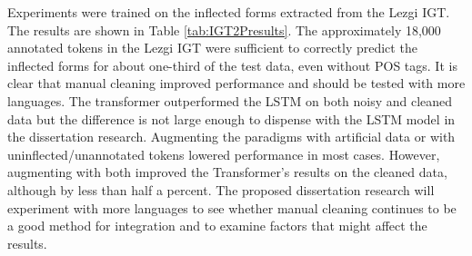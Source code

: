 Experiments were trained on the inflected forms extracted from the Lezgi IGT. The results are shown in Table \ref{tab:IGT2Presults}. The approximately 18,000 annotated tokens in the Lezgi IGT were sufficient to correctly predict the inflected forms for about one-third of the test data, even without POS tags. It is clear that manual cleaning improved performance and should be tested with more languages. The transformer outperformed the LSTM on both noisy and cleaned data but the difference is not large enough to dispense with the LSTM model in the dissertation research. 
Augmenting the paradigms with artificial data or with uninflected/unannotated tokens lowered performance in most cases. However, augmenting with both improved the Transformer's results on the cleaned data, although by less than half a percent. 
The proposed dissertation research will experiment with more languages to see whether manual cleaning continues to be a good method for integration and to examine factors that might affect the results.  




